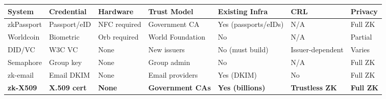\documentclass[11pt, a4paper]{article}
\begin{document}
\begin{longtable}[]{@{}
  >{\raggedright\arraybackslash}p{}
  >{\raggedright\arraybackslash}p{}
  >{\raggedright\arraybackslash}p{}
  >{\raggedright\arraybackslash}p{}
  >{\raggedright\arraybackslash}p{}
  >{\raggedright\arraybackslash}p{}
  >{\raggedright\arraybackslash}p{}@{}}
\toprule\noalign{}
\begin{minipage}[b]{\linewidth}\raggedright
System
\end{minipage} & \begin{minipage}[b]{\linewidth}\raggedright
Credential
\end{minipage} & \begin{minipage}[b]{\linewidth}\raggedright
Hardware
\end{minipage} & \begin{minipage}[b]{\linewidth}\raggedright
Trust Model
\end{minipage} & \begin{minipage}[b]{\linewidth}\raggedright
Existing Infra
\end{minipage} & \begin{minipage}[b]{\linewidth}\raggedright
CRL
\end{minipage} & \begin{minipage}[b]{\linewidth}\raggedright
Privacy
\end{minipage} \\
\midrule\noalign{}
\endhead
\bottomrule\noalign{}
\endlastfoot
zkPassport \cite{ref2} & Passport/eID & NFC required & Government CA & Yes
(passports/eIDs) & N/A & Full ZK \\
Worldcoin \cite{ref3} & Biometric & Orb required & World Foundation & No
& N/A & Partial \\
DID/VC \cite{ref13} & W3C VC & None & New issuers & No (must build) &
Issuer-dependent & Varies \\
Semaphore \cite{ref8} & Group key & None & Group admin & No & N/A & Full
ZK \\
zk-email \cite{ref9} & Email DKIM & None & Email providers & Yes (DKIM) & No
& Full ZK \\
\textbf{zk-X509} & \textbf{X.509 cert} & \textbf{None} &
\textbf{Government CAs} & \textbf{Yes (billions)} & \textbf{Trustless
ZK} & \textbf{Full ZK} \\
\end{longtable}
\end{document}
